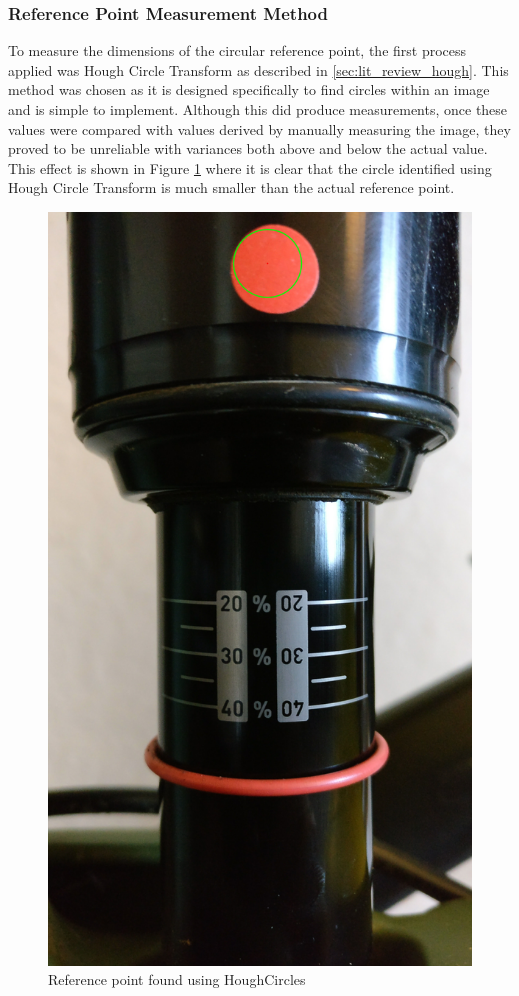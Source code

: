 		\subsubsection{Reference Point Measurement Method}
			To measure the dimensions of the circular reference point, the first process applied was Hough Circle Transform as described in \ref{sec:lit_review_hough}. This method was chosen as it is designed specifically to find circles within an image and is simple to implement. Although this did produce measurements, once these values were compared with values derived by manually measuring the image, they proved to be unreliable with variances both above and below the actual value. This effect is shown in Figure \ref{fig:hough_circle} where it is clear that the circle identified using Hough Circle Transform is much smaller than the actual reference point.
			\begin{figure}[h!]
				\centering
				\includegraphics[scale=0.1,
				trim={30cm 140cm 25cm 0},
				clip]{../images/results/HoughCircles.jpg}
				\caption{Reference point found using HoughCircles}
				\label{fig:hough_circle}
			\end{figure}
